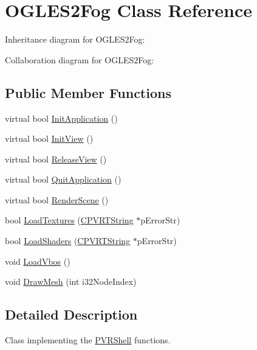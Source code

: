 \hypertarget{class_o_g_l_e_s2_fog}{\section{O\+G\+L\+E\+S2\+Fog Class Reference}
\label{class_o_g_l_e_s2_fog}
}


Inheritance diagram for O\+G\+L\+E\+S2\+Fog\+:


Collaboration diagram for O\+G\+L\+E\+S2\+Fog\+:
\subsection*{Public Member Functions}
\begin{DoxyCompactItemize}
\item 
virtual bool \hyperlink{class_o_g_l_e_s2_fog_a32bb7a21f387681f2b51fc9b5d15ee75}{Init\+Application} ()
\item 
virtual bool \hyperlink{class_o_g_l_e_s2_fog_a088e6722940d7c81b7534c74941b4bb8}{Init\+View} ()
\item 
virtual bool \hyperlink{class_o_g_l_e_s2_fog_a27493f482e99cb9a12b470c53fee26a1}{Release\+View} ()
\item 
virtual bool \hyperlink{class_o_g_l_e_s2_fog_a04460e364618b762af0abec2acb4c0d8}{Quit\+Application} ()
\item 
virtual bool \hyperlink{class_o_g_l_e_s2_fog_aa6f7fbd9699f9997f3e04629a152c3c8}{Render\+Scene} ()
\item 
bool \hyperlink{class_o_g_l_e_s2_fog_a3022b5db4e0723f380a0cf35cf17363a}{Load\+Textures} (\hyperlink{class_c_p_v_r_t_string}{C\+P\+V\+R\+T\+String} $\ast$p\+Error\+Str)
\item 
bool \hyperlink{class_o_g_l_e_s2_fog_ada173efc03d1433e2ca4143b0cd8bd74}{Load\+Shaders} (\hyperlink{class_c_p_v_r_t_string}{C\+P\+V\+R\+T\+String} $\ast$p\+Error\+Str)
\item 
void \hyperlink{class_o_g_l_e_s2_fog_adf5f4c5155b9dfa16d1389aee36a1db3}{Load\+Vbos} ()
\item 
void \hyperlink{class_o_g_l_e_s2_fog_a4bf5c26a2683d800d2a1eea3a53c2161}{Draw\+Mesh} (int i32\+Node\+Index)
\end{DoxyCompactItemize}


\subsection{Detailed Description}


 Class implementing the \hyperlink{class_p_v_r_shell}{P\+V\+R\+Shell} functions. 

